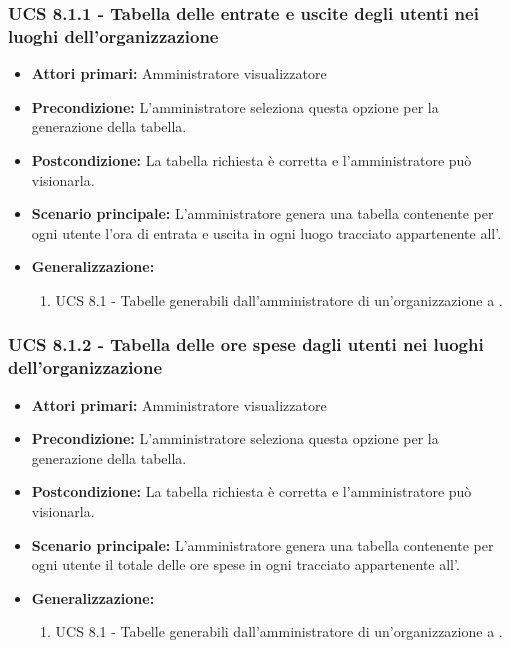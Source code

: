 \subsubsection{UCS 8.1.1 - Tabella delle entrate e uscite degli utenti nei luoghi dell'organizzazione}%
\begin{itemize}
\item \textbf{Attori primari:} Amministratore visualizzatore
\item \textbf{Precondizione:} L'amministratore seleziona questa opzione per la generazione della tabella.
\item \textbf{Postcondizione:} La tabella richiesta è corretta e l'amministratore può visionarla.
\item \textbf{Scenario principale:} L'amministratore genera una tabella contenente per ogni utente l'ora di entrata e uscita in ogni luogo tracciato appartenente all'.
\item \textbf{Generalizzazione:}
	\begin{enumerate}
		\item UCS 8.1 - Tabelle generabili dall'amministratore di un'organizzazione a .
	\end{enumerate} 
\end{itemize}

\subsubsection{UCS 8.1.2 - Tabella delle ore spese dagli utenti nei luoghi dell'organizzazione}%
\begin{itemize}
\item \textbf{Attori primari:} Amministratore visualizzatore
\item \textbf{Precondizione:} L'amministratore seleziona questa opzione per la generazione della tabella.
\item \textbf{Postcondizione:} La tabella richiesta è corretta e l'amministratore può visionarla.
\item \textbf{Scenario principale:} L'amministratore genera una tabella contenente per ogni utente il totale delle ore spese in ogni  tracciato appartenente all'.
\item \textbf{Generalizzazione:}
	\begin{enumerate}
		\item UCS 8.1 - Tabelle generabili dall'amministratore di un'organizzazione a .
	\end{enumerate} 
\end{itemize}

